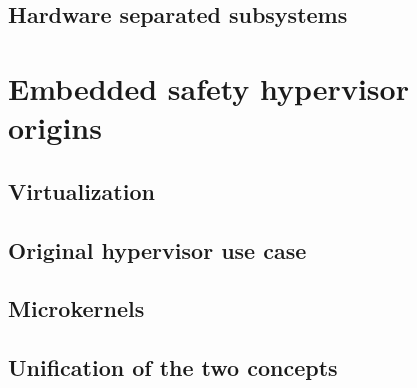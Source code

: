 \subsection{Hardware separated subsystems}


\section{Embedded safety hypervisor origins}
\subsection{Virtualization}
\subsection{Original hypervisor use case}
\subsection{Microkernels}
\subsection{Unification of the two concepts}


